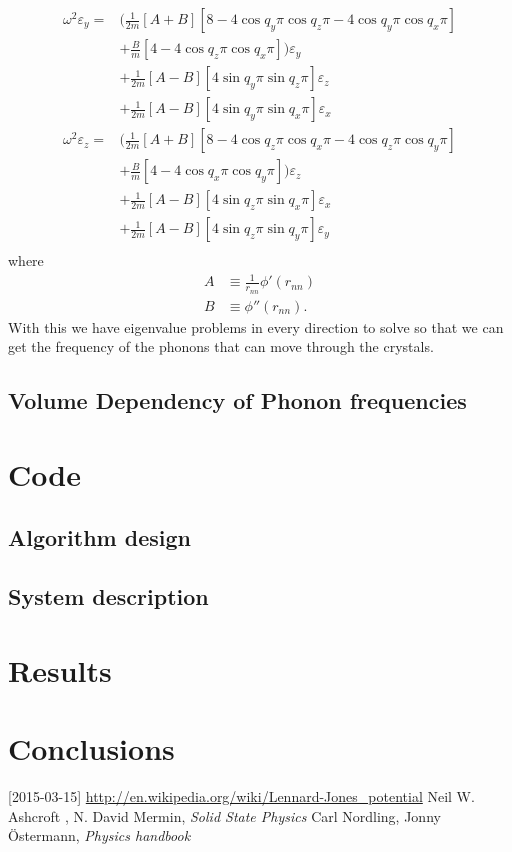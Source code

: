 \documentclass[11pt]{article}
\begin{document}
\begin{align}
	\omega^2\varepsilon_y = &\big( \frac{1}{2m} [A+B][8-4\cos{q_y\pi}\cos{q_z\pi}-4\cos{q_y\pi}\cos{q_x\pi}] \\
	&+ \frac{B}{m}[4-4\cos{q_z\pi}\cos{q_x\pi}]\big)\varepsilon_y \\
	&+\frac{1}{2m}[A-B][4\sin{q_y\pi}\sin{q_z\pi}]\varepsilon_z \\
	&+\frac{1}{2m}[A-B][4\sin{q_y\pi}\sin{q_x\pi}]\varepsilon_x \\
	\omega^2\varepsilon_z = &\big( \frac{1}{2m} [A+B][8-4\cos{q_z\pi}\cos{q_x\pi}-4\cos{q_z\pi}\cos{q_y\pi}] \\
	&+ \frac{B}{m}[4-4\cos{q_x\pi}\cos{q_y\pi}]\big)\varepsilon_z \\
	&+\frac{1}{2m}[A-B][4\sin{q_z\pi}\sin{q_x\pi}]\varepsilon_x \\
	&+\frac{1}{2m}[A-B][4\sin{q_z\pi}\sin{q_y\pi}]\varepsilon_y \\
\end{align}
where
\begin{align}
	A &\equiv \frac{1}{r_{nn}} \phi'(r_{nn}) \\
	B &\equiv \phi''(r_{nn}).
\end{align}
With this we have eigenvalue problems in every direction to solve so that we can get the frequency of the phonons that can move through the crystals. 
\subsection{Volume Dependency of Phonon frequencies}
\section{Code}
\subsection{Algorithm design}
\subsection{System description}

\section{Results}

\section{Conclusions}
\begin{thebibliography}{99}
 [2015-03-15] \url{http://en.wikipedia.org/wiki/Lennard-Jones_potential}
 Neil W. Ashcroft , N. David Mermin, \textit{Solid State Physics} 
 Carl Nordling, Jonny Östermann, \textit{Physics handbook}
\end{thebibliography}
\end{document}
